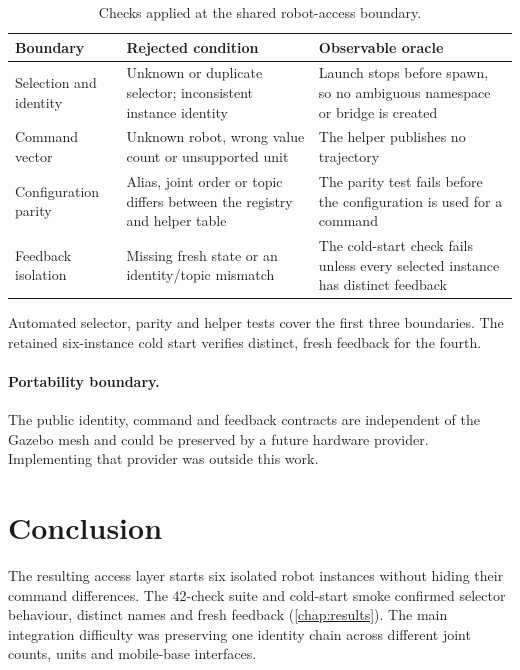 \begin{table}[htbp]
\centering
\small
\renewcommand{\arraystretch}{1.04}
\caption{Checks applied at the shared robot-access boundary.}
\label{tab:robot-access-checks}
\begin{tabularx}{\textwidth}{@{}
>{\raggedright\arraybackslash}p{}
>{\raggedright\arraybackslash}p{}
>{\raggedright\arraybackslash}X@{}}
\toprule
\textbf{Boundary} & \textbf{Rejected condition} & \textbf{Observable oracle}\\
\midrule
Selection and identity & Unknown or duplicate selector; inconsistent instance
identity & Launch stops before spawn, so no ambiguous namespace or bridge is
created\\ \tablerowrule
Command vector & Unknown robot, wrong value count or unsupported unit & The
helper publishes no trajectory\\ \tablerowrule
Configuration parity & Alias, joint order or topic differs between the registry
and helper table & The parity test fails before the configuration is used for a
command\\ \tablerowrule
Feedback isolation & Missing fresh state or an identity/topic mismatch & The
cold-start check fails unless every selected instance has distinct feedback\\
\bottomrule
\end{tabularx}
\end{table}

Automated selector, parity and helper tests cover the first three boundaries.
The retained six-instance cold start verifies distinct, fresh feedback for the
fourth.

\paragraph{Portability boundary.}

The public identity, command and feedback contracts are independent of the
Gazebo mesh and could be preserved by a future hardware provider. Implementing
that provider was outside this work.

\section{Conclusion}

The resulting access layer starts six isolated robot instances without hiding
their command differences. The 42-check suite and cold-start smoke confirmed
selector behaviour, distinct names and fresh feedback
(\cref{chap:results}). The main integration difficulty was preserving one
identity chain across different joint counts, units and mobile-base interfaces.
